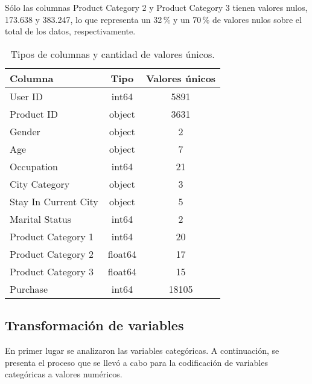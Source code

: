 \documentclass[12pt]{article}
\begin{document}
Sólo las columnas Product Category 2 y Product Category 3 tienen valores nulos,
173.638 y 383.247, lo que representa un 32\,\% y un 70\,\%  de valores nulos sobre 
el total de los datos, respectivamente.

\begin{table}[ht]
    \centering
    \caption{Tipos de columnas y cantidad de valores únicos.}
    \begin{tabular}{l c c }
        \toprule
        \textbf{Columna} & \textbf{Tipo} & \textbf{Valores únicos} \\
        \midrule
        User ID   &  int64    &   5891  \\
        Product ID & object   &   3631  \\
        Gender     &  object  &   2  \\
        Age        &   object &   7    \\
        Occupation   &  int64     &   21     \\
        City Category  &  object    &  3     \\
        Stay In Current City  & object   &  5\\
        Marital Status        &        int64     &   2  \\
        Product Category 1     &       int64   &    20  \\
        Product Category 2   &        float64    &    17 \\
        Product Category 3     &      float64   &     15 \\
        Purchase            &           int64  &   18105 \\
        \bottomrule
    \end{tabular}
    \label{tab:colsdataset}
\end{table}

\subsection{Transformación de variables}

En primer lugar se analizaron las variables categóricas. A continuación, se presenta el proceso que se llevó a cabo para la codificación de variables categóricas a 
valores numéricos. 
\end{document}
